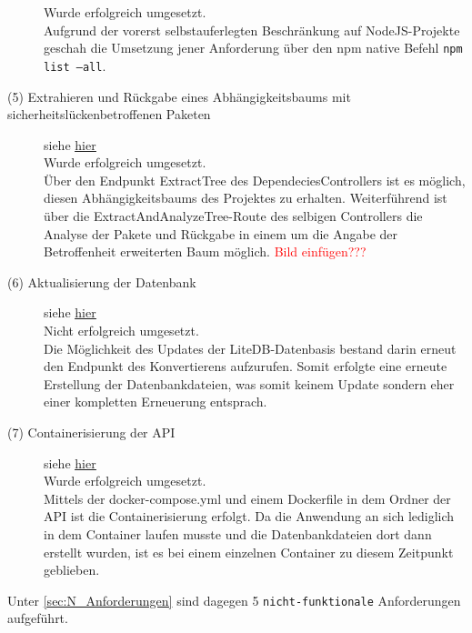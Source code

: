 \begin{description}
            Wurde erfolgreich umgesetzt.
            \\
            Aufgrund der vorerst selbstauferlegten Beschränkung auf NodeJS-Projekte geschah die Umsetzung jener Anforderung über den npm native Befehl \texttt{npm list --all}.
        \item[(5) Extrahieren und Rückgabe eines Abhängigkeitsbaums mit sicher\-heits\-lücken\-betroffenen Paketen] siehe \hyperref[f:five]{\underline{hier}} \hfill \\
            Wurde erfolgreich umgesetzt.
            \\
            Über den Endpunkt ExtractTree des DependeciesControllers ist es möglich, diesen Abhängigkeitsbaums des Projektes zu erhalten.
            Weiterführend ist über die ExtractAndAnalyzeTree-Route des selbigen Controllers die Analyse der Pakete und Rückgabe in einem um die Angabe der Betroffenheit erweiterten Baum möglich.
            \textcolor{red}{Bild einfügen???}
        \item[(6) Aktualisierung der Datenbank] siehe \hyperref[f:six]{\underline{hier}} \hfill \\
            Nicht erfolgreich umgesetzt.
            \\
            Die Möglichkeit des Updates der LiteDB-Datenbasis bestand darin erneut den Endpunkt des Konvertierens aufzurufen.
            Somit erfolgte eine erneute Erstellung der Datenbankdateien, was somit keinem Update sondern eher einer kompletten Erneuerung entsprach.
        \item[(7) Containerisierung der \ac{API}] siehe \hyperref[f:seven]{\underline{hier}} \hfill \\
            Wurde erfolgreich umgesetzt.
            \\
            Mittels der docker-compose.yml und einem Dockerfile in dem Ordner der API ist die Containerisierung erfolgt.
            Da die Anwendung an sich lediglich in dem Container laufen musste und die Datenbankdateien dort dann erstellt wurden, ist es bei einem einzelnen Container zu diesem Zeitpunkt geblieben.
    \end{description}

    \noindent Unter \ref{sec:N_Anforderungen}  sind dagegen 5 \texttt{nicht-funktionale} Anforderungen aufgeführt.

